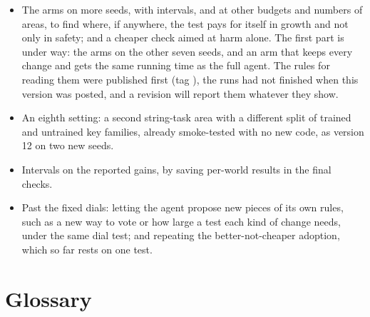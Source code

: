 \documentclass[11pt]{article}
\begin{document}
\begin{itemize}[leftmargin=*]
\item The arms on more seeds, with intervals, and at other budgets and numbers of areas, to find where, if anywhere, the test pays for itself in growth and not only in safety; and a cheaper check aimed at harm alone. The first part is under way: the arms on the other seven seeds, and an arm that keeps every change and gets the same running time as the full agent. The rules for reading them were published first (tag ), the runs had not finished when this version was posted, and a revision will report them whatever they show.
\item An eighth setting: a second string-task area with a different split of trained and untrained key families, already smoke-tested with no new code, as version 12 on two new seeds.
\item Intervals on the reported gains, by saving per-world results in the final checks.
\item Past the fixed dials: letting the agent propose new pieces of its own rules, such as a new way to vote or how large a test each kind of change needs, under the same dial test; and repeating the better-not-cheaper adoption, which so far rests on one test.
\end{itemize}

\section{Glossary}
\end{document}
